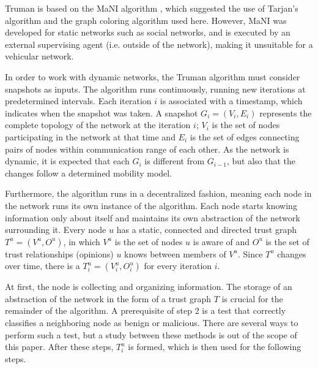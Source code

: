 \documentclass[conference]{IEEEtran}
\begin{document}
Truman is based on the MaNI algorithm \cite{vernize2015malicious}, which suggested the use of Tarjan's algorithm and the graph coloring algorithm used here.
However, MaNI was developed for static networks such as social networks, and is executed by an external supervising agent (i.e. outside of the network), making it unsuitable for a vehicular network.

In order to work with dynamic networks, the Truman algorithm must consider snapshots as inputs.
The algorithm runs continuously, running new iterations at predetermined intervals.
Each iteration $i$ is associated with a timestamp, which indicates when the snapshot was taken.
A snapshot $G_i = (V_i, E_i)$ represents the complete topology of the network at the iteration $i$; $V_i$ is the set of nodes participating in the network at that time and $E_i$ is the set of edges connecting pairs of nodes within communication range of each other.
As the network is dynamic, it is expected that each $G_i$ is different from $G_{i-1}$, but also that the changes follow a determined mobility model.

Furthermore, the algorithm runs in a decentralized fashion, meaning each node in the network runs its own instance of the algorithm.
Each node starts knowing information only about itself and maintains its own abstraction of the network surrounding it.
Every node $u$ has a static, connected and directed trust graph $T^u = (V^u, O^u)$, in which $V^u$ is the set of nodes $u$ is aware of and $O^u$ is the set of trust relationships (opinions) $u$ knows between members of $V^u$.
Since $T^u$ changes over time, there is a $T^u_i = (V^u_i, O^u_i)$ for every iteration $i$.




At first, the node is collecting and organizing information.
The storage of an abstraction of the network in the form of a trust graph $T$ is crucial for the remainder of the algorithm.
A prerequisite of step 2 is a test that correctly classifies a neighboring node as benign or malicious.
There are several ways to perform such a test, but a study between these methods is out of the scope of this paper.
After these steps, $T^u_i$ is formed, which is then used for the following steps.
\end{document}
